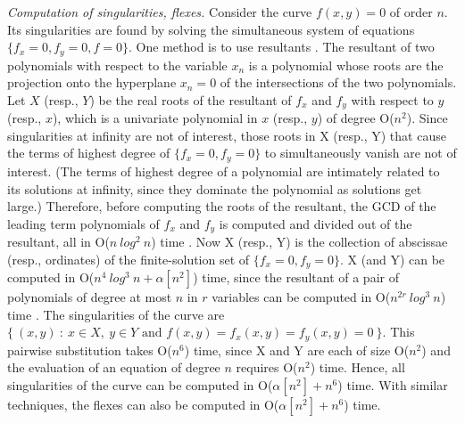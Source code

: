 {\em Computation of singularities, flexes.} 
%
Consider the curve $f(x,y) = 0$ of order $n$.
Its singularities are found by solving the simultaneous system
of equations \mbox{$\{f_{x} = 0, f_{y}=0, f = 0\}$}.
One method is to use resultants \cite{walker}.
The resultant of two polynomials with respect to the variable $x_{n}$ is a polynomial
whose roots are the projection onto the hyperplane $x_{n} = 0$
of the intersections of the two polynomials.
Let $X$ (resp., $Y$) be the real roots of the resultant of $f_{x}$ and $f_{y}$ 
with respect to $y$ (resp., $x$), which is a univariate polynomial in $x$ (resp., $y$)
of degree O($n^{2}$).
Since singularities at infinity are not of interest, those roots in X (resp., Y)
that cause the terms of highest degree of \mbox{$\{f_{x} = 0, f_{y}=0\}$} to 
simultaneously vanish are not of interest.
(The terms of highest degree of a polynomial are intimately related to its solutions at 
infinity, since they dominate the polynomial as solutions get large.)
Therefore, before computing the roots of the resultant, the GCD of the leading term
polynomials of $f_{x}$ and $f_{y}$ is computed and divided out of the resultant, all in 
O($n\ log^{2}\ n$) time \cite{ahu}.
Now X (resp., Y) is the collection of abscissae (resp., ordinates)
of the finite-solution set of \mbox{$\{f_{x} = 0, f_{y}=0\}$}.
X (and Y) can be computed in O($n^{4}\ log^{3}\ n + \alpha[n^{2}]$) time, since
the resultant of a pair of polynomials of degree at most $n$ in $r$ variables 
can be computed in O($n^{2r}\ log^{3}\ n$) time \cite{bajj}.
The singularities of the curve are
\mbox{$\{\ (x,y)\ :\ x\in X,\ y \in Y \mbox{ and } f(x,y) = f_{x}(x,y) = f_{y}(x,y) = 
0\ \}$.}
This pairwise substitution takes O($n^{6}$) 
time, since X and Y are each of size O($n^{2}$) and the evaluation of an equation of 
degree $n$ requires O($n^{2}$) time.
Hence, all singularities of the curve can be computed in O($\alpha[n^{2}] + n^{6}$)
time.
With similar techniques, the flexes can also be computed in O($\alpha[n^{2}] + n^{6}$)
time.

